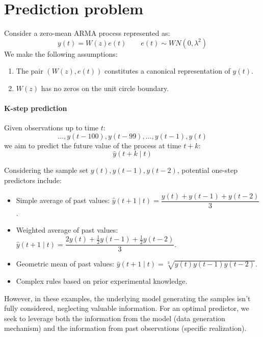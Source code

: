 \section{Prediction problem}

Consider a zero-mean ARMA process represented as:
\[y(t)=W(z)e(t) \qquad e(t)\sim WN(0,\lambda^2)\]
We make the following assumptions:
\begin{enumerate}
    \item The pair $\left( W(z),e(t) \right)$ constitutes a canonical representation of $y(t)$.
    \item $W(z)$ has no zeros on the unit circle boundary.
\end{enumerate}

\paragraph*{K-step prediction}
Given observations up to time $t$:
\[\dots,y(t-100),y(t-99),\dots,y(t-1),y(t)\]
we aim to predict the future value of the process at time $t+k$:
\[\hat{y}(t+k\mid t)\]

Considering the sample set $y(t), y(t-1),y(t-2)$, potential one-step predictors include:
\begin{itemize}
    \item Simple average of past values: $\hat{y}(t+1\mid t)=\dfrac{y(t)+y(t-1)+y(t-2)}{3}$.
    \item Weighted average of past values: $\hat{y}(t+1\mid t)=\dfrac{2y(t)+\frac{1}{2}y(t-1)+\frac{1}{2}y(t-2)}{3}$.
    \item Geometric mean of past values: $\hat{y}(t+1\mid t)=\sqrt[3]{y(t)y(t-1)y(t-2)}$.
    \item Complex rules based on prior experimental knowledge.
\end{itemize}
However, in these examples, the underlying model generating the samples isn't fully considered, neglecting valuable information.
For an optimal predictor, we seek to leverage both the information from the model (data generation mechanism) and the information from past observations (specific realization).